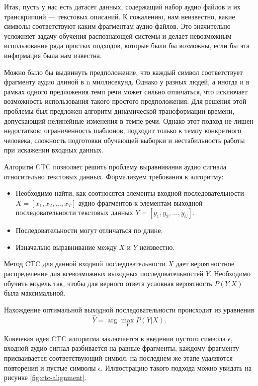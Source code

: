 Итак, пусть у нас есть датасет данных, содержащий набор аудио файлов и их транскрипций --- текстовых описаний. К сожалению, нам неизвестно, какие символы соответствуют каким фрагментам аудио файлов. Это значительно усложняет задачу обучения распознающей системы и делает невозможным использование ряда простых подходов, которые были бы возможны, если бы эта информация была нам известна.

Можно было бы выдвинуть предположение, что каждый символ соответствует фрагменту аудио длиной в n миллисекунд. Однако у разных людей, а иногда и в рамках одного предложения темп речи может сильно отличаться, что исключает возможность использования такого простого предположения. Для решения этой проблемы был предложен алгоритм динамической трансформации времени\cite{berndt1994using}, допускающий нелинейные изменения в темпе речи. Однако этот подход не лишен недостатков: ограниченность шаблонов, подходит только к темпу конкретного человека, сложность подготовки обучающей выборки и нестабильность работы при искажении входных данных.

Алгоритм CTC позволяет решить проблему выравнивания аудио сигнала относительно текстовых данных. Формализуем требования к алгоритму:
\begin{itemize}
	\item Необходимо найти, как соотносятся элементы входной последовательности $X = [x_1, x_2, \dots, x_T]$ аудио фрагментов к элементам выходной последовательности текстовых данных $Y = [y_1, y_2, \dots, y_U]$.
	\item Последовательности могут отличаться по длине.
	\item Изначально выравнивание между $X$ и $Y$ неизвестно.
\end{itemize}

Метод CTC для данной входной последовательности $X$ дает вероятностное распределение для всевозможных выходных последовательностей $Y$. Необходимо обучить модель так, чтобы для верного ответа условная вероятность $P(Y | X)$ была максимальной.

Нахождение оптимальной выходной последовательности происходит из уравнения
\begin{equation}
	\label{eq:ctc-result}
	\hat{Y} = \arg \max_Y P(Y | X).
\end{equation}

Ключевая идея CTC алгоритма заключается в введении пустого символа $\epsilon$, входной аудио сигнал разбивается на равные фрагменты, каждому фрагменту присваивается соответствующий символ, на последнем же этапе удаляются повторения и пустые символы $\epsilon$. Иллюстрацию такого подхода можно увидать на рисунке \ref{fig:ctc-alignment}.

